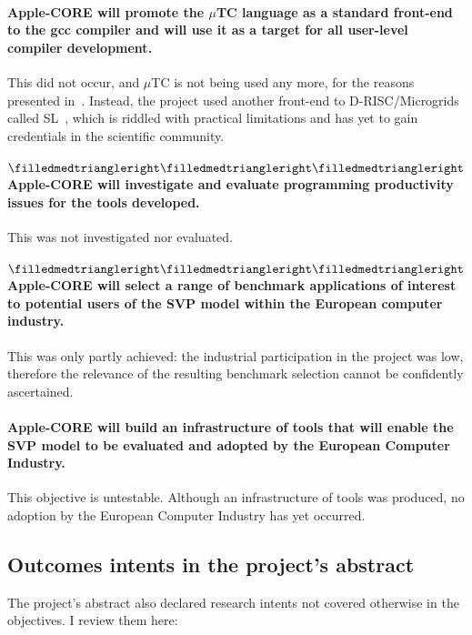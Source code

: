 \paragraph{
Apple-CORE will promote the $\mu$TC language as a standard front-end
to the gcc compiler and will use it as a target for all user-level
compiler development.}  This did not occur, and $\mu$TC is not being
used any more, for the reasons presented in~\cite[App.~G]{poss.12}. Instead,
the project used another front-end to D-RISC/Microgrids called SL~\cite{poss.12.sl}, which
is riddled with practical limitations and has yet to gain credentials in the scientific community.

\paragraph{
$\filledmedtriangleright\filledmedtriangleright\filledmedtriangleright$
Apple-CORE will investigate and evaluate programming productivity issues for the tools developed.}
This was not investigated nor evaluated.

\paragraph{
$\filledmedtriangleright\filledmedtriangleright\filledmedtriangleright$
Apple-CORE will select a range of benchmark applications of interest to potential users of the SVP model within the European computer industry.}
This was only partly achieved: the industrial participation in the project was low, therefore the relevance of the resulting benchmark selection
cannot be confidently ascertained.

\paragraph{Apple-CORE will build an infrastructure of tools that will enable the SVP model to be evaluated and adopted by the European Computer Industry.}
This objective is untestable. Although an infrastructure of tools was produced, no adoption by the European Computer Industry has yet occurred.



\subsection{Outcomes \vs intents in the project's abstract}

The project's abstract also declared research intents not
covered otherwise in the objectives. I review them here:

